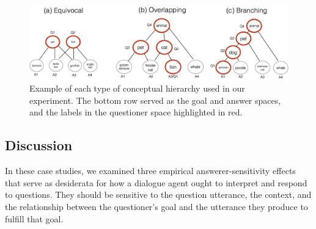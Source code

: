 \documentclass[12pt, floatsintext, jou]{apa6}
\begin{document}

\begin{figure}[t!]
\begin{center}
\includegraphics[scale = .35]{Exp1/hierarchyStructureExamples.png}
\end{center}
\caption{Example of each type of conceptual hierarchy used in our experiment. The bottom row served as the goal and answer spaces, and the labels in the questioner space highlighted in red.}
\label{fig:hierarchyStructures}
\end{figure}


\subsection{Discussion}

In these case studies, we examined three empirical answerer-sensitivity effects that serve as desiderata for how a dialogue agent ought to interpret and respond to questions. 
They should be sensitive to the question utterance, the context, and the relationship between the questioner's goal and the utterance they produce to fulfill that goal.
\end{document}
